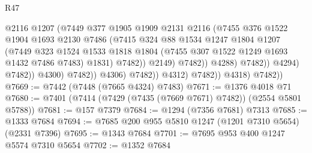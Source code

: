\begin{lexlean}{R47}
\begin{coremodule}
                                            @2116
                                            @1207
                                            (@7449
                                              @377
                                              @1905
                                              @1909
                                              @2131
                                              @2116
                                              (@7455
                                                @376
                                                @1522
                                                @1904
                                                @1693
                                                @2130
                                                @7486
                                                (@7415
                                                  @324
                                                  @88
                                                  @1534
                                                  @1247
                                                  @1804
                                                  @1207
                                                  (@7449
                                                    @323
                                                    @1524
                                                    @1533
                                                    @1818
                                                    @1804
                                                    (@7455 @307 @1522 @1249 @1693 @1432 @7486 @7483)
                                                    @1831)
                                                  @7482))
                                              @2149)
                                            @7482))
                                        @4288)
                                      @7482))
                                  @4294)
                                @7482))
                            @4300)
                          @7482))
                      @4306)
                    @7482))
                @4312)
              @7482))
          @4318)
        @7482))
@7669 := @7442 (@7448 (@7665 @4324) @7483)
@7671 := @1376 @4018 @71
@7680 := @7401 (@7414 (@7429 (@7435 (@7669 @7671) @7482)) (@2554 @5801 @5788))
@7681 := @157 @7379
@7684 := @1294 (@7356 @7681) @7313
@7685 := @1333 @7684
@7694 := @7685 @200 @955 @5810 @1247 (@1201 @7310 @5654) (@2331 @7396)
@7695 := @1343 @7684
@7701 := @7695 @953 @400 @1247 @5574 @7310 @5654
@7702 := @1352 @7684

\end{coremodule}
\end{lexlean}
